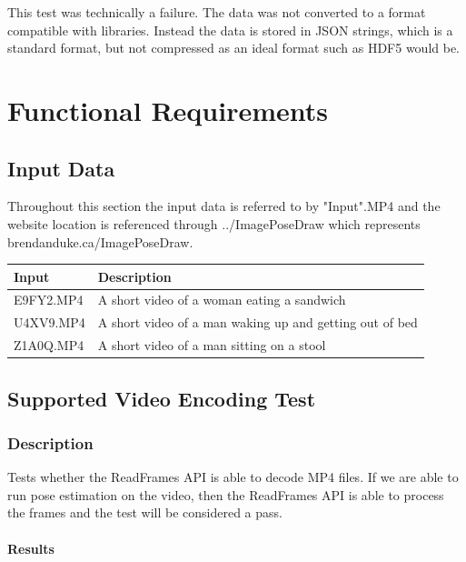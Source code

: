\documentclass{scrreprt}
\begin{document}
This test was technically a failure. The data was not converted to a format
compatible with libraries. Instead the data is stored in JSON strings, which is
a standard format, but not compressed as an ideal format such as HDF5 would be.


\chapter{Functional Requirements}

\section{Input Data}

Throughout this section the input data is referred to by "Input".MP4 and the website location is referenced through ../ImagePoseDraw which represents brendanduke.ca/ImagePoseDraw.

\begin{table}[H]
        \centering
        \begin{tabular}{p{3cm}p{6cm}}
                \hline\hline
                Input & Description\\
                \hline\hline
                E9FY2.MP4  &  A short video of a woman eating a sandwich\\
                \hline
                U4XV9.MP4  &  A short video of a man waking up and getting out of bed\\
                \hline
                Z1A0Q.MP4 & A short video of a man sitting on a stool\\
                \hline
        \end{tabular}
\end{table}

\section{Supported Video Encoding Test}

\subsection{Description}

Tests whether the ReadFrames API is able to decode MP4 files. If we are able to run pose estimation on the video, then the ReadFrames API is able to process the frames and the test will be considered a pass.

\subsubsection{Results}
\end{document}
